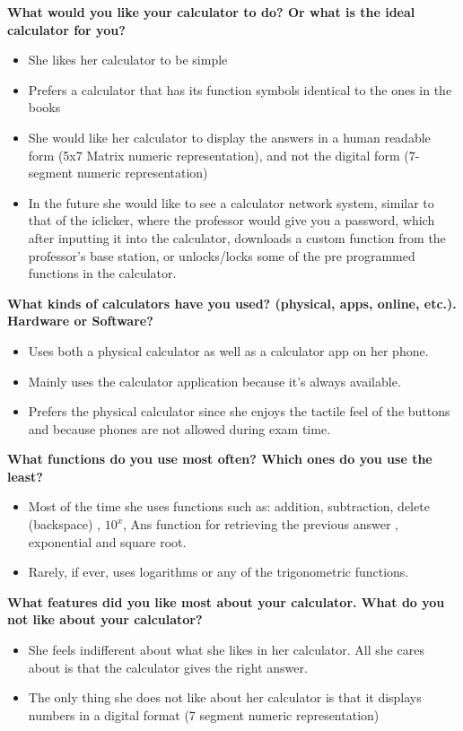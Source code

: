 \documentclass[a4paper]{article}
\begin{document}
\textbf{What would you like your calculator to do? Or what is the ideal calculator for you?}
\begin{itemize}
\itemsep0em 
\item She likes her calculator to be simple
\item Prefers a calculator that has its function symbols identical to the ones in the books
\item She would like her calculator to display the answers in a human readable form (5x7 Matrix numeric representation), and not the digital form (7-segment numeric representation)
\item In the future she would like to see a calculator network system, similar to that of the iclicker, where the professor would give you a password, which after inputting it into the calculator, downloads a custom function from the professor's base station, or unlocks/locks some of the pre programmed functions in the calculator.
\end{itemize}

\textbf{What kinds of calculators have you used? (physical, apps, online, etc.). Hardware or Software?}
\begin{itemize}
\itemsep0em 
\item Uses both a physical calculator as well as a calculator app on her phone.
\item Mainly uses the calculator application because it’s always available.
\item Prefers the physical calculator since she enjoys the tactile feel of the buttons and because phones are not allowed during exam time.
\end{itemize}

\textbf{What functions do you use most often? Which ones do you use the least?}
\begin{itemize}
\itemsep0em 
\item Most of the time she uses functions such as: addition, subtraction, delete (backspace) , $10^x$, Ans function for retrieving the previous answer , exponential and square root.
\item Rarely, if ever, uses logarithms or any of the trigonometric functions.
\end{itemize}

\textbf{What features did you like most about your calculator. What do you not like about your calculator?}
\begin{itemize}
\itemsep0em 
\item She feels indifferent about what she likes in her calculator. All she cares about is that the calculator gives the right answer.
\item The only thing she does not like about her calculator is that it displays numbers in a digital format (7 segment numeric representation)
\end{itemize}
\end{document}
